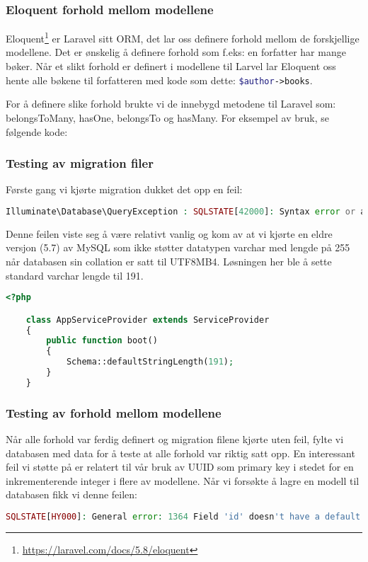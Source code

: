 \subsubsection{Eloquent forhold mellom modellene}
Eloquent\footnote{\url{https://laravel.com/docs/5.8/eloquent}} er Laravel sitt ORM, det lar oss definere forhold mellom de forskjellige modellene. Det er ønskelig å definere forhold som f.eks: en forfatter har mange bøker. Når et slikt forhold er definert i modellene til Larvel lar Eloquent oss hente alle bøkene til forfatteren med kode som dette: \lstinline[language=PHP]{$author->books}.

For å definere slike forhold brukte vi de innebygd metodene til Laravel som: belongsToMany, hasOne, belongsTo og hasMany. For eksempel av bruk, se følgende kode:


\subsubsection{Testing av migration filer}
Første gang vi kjørte migration dukket det opp en feil:
\begin{lstlisting}[caption={Feilmelding i Laravel ved kjøring av migration},language=PHP]
Illuminate\Database\QueryException : SQLSTATE[42000]: Syntax error or access violation: 1071 Specified key was too long; max key length is 767 bytes (SQL: alter table `users` add unique `users_email_unique`(`email`))
\end{lstlisting}
Denne feilen viste seg å være relativt vanlig og kom av at vi kjørte en eldre versjon (5.7) av MySQL som ikke støtter datatypen varchar med lengde på 255 når databasen sin collation er satt til UTF8MB4. Løsningen her ble å sette standard varchar lengde til 191.
\begin{lstlisting}[language=PHP, caption={Definering av standard varchar lengde i AppServiceProvider.php}]
    <?php

    class AppServiceProvider extends ServiceProvider
    {
        public function boot()
        {
            Schema::defaultStringLength(191);
        }
    }
\end{lstlisting}

\subsubsection{Testing av forhold mellom modellene}
Når alle forhold var ferdig definert og migration filene kjørte uten feil, fylte vi databasen med data for å teste at alle forhold var riktig satt opp. En interessant feil vi støtte på er relatert til vår bruk av UUID som primary key i stedet for en inkrementerende integer i flere av modellene. Når vi forsøkte å lagre en modell til databasen fikk vi denne feilen:
\begin{lstlisting}[language=PHP]
    SQLSTATE[HY000]: General error: 1364 Field 'id' doesn't have a default value ...
\end{lstlisting}

